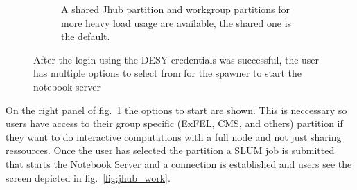 \documentclass[10pt]{scrartcl}
\begin{document}
\begin{figure}
\begin{subfigure}{0.45\textwidth}
	  \caption{A shared Jhub partition and workgroup partitions for more heavy load usage are available, the shared one is the default.} %
  \end{subfigure}
  \caption{After the login using the DESY credentials was successful, the user has multiple options to select from for the spawner to start the notebook server}
  \label{fig:jhub_spawn}
\end{figure}
%
On the right panel of fig.~\ref{fig:jhub_spawn} the options to start are shown. 
This is neccessary so users have access to their group specific (ExFEL, CMS, and others) partition if they want to do interactive computations with a full node and not just sharing ressources.
Once the user has selected the partition a SLUM job is submitted that starts the Notebook Server and a connection is established and users see the screen depicted in fig.~\ref{fig:jhub_work}. 
%
\end{document}

